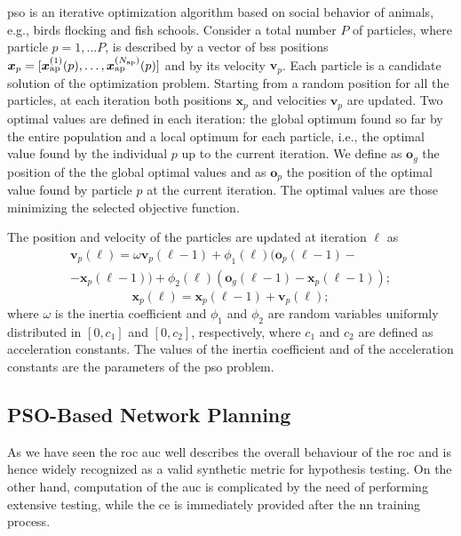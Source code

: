 \documentclass[conference,draftcls,onecolumn]{IEEEtran}
\begin{document}
\ac{pso} is an iterative optimization algorithm based on social behavior of animals, e.g., birds flocking and fish schools. Consider a total number $P$ of particles, where  particle $p=1, \ldots P$, is described by a vector of \acp{bs} positions $\bm{x}_p = [\bm{x}_{\rm ap}^{(1)}(p),\ldots, \bm{x}_{\rm ap}^{(N_{\rm ap})}(p)]$ and by its velocity $\bm{v}_p$.  Each particle is a candidate solution of the optimization problem. Starting from a random position for all the particles, at each iteration both  positions $\bm{x}_p$ and  velocities $\bm{v}_p$ are updated. Two optimal values are defined in each iteration: the global optimum found so far by the entire population and a local optimum for each particle, i.e., the optimal value found by the individual $p$ up to the current iteration. We define as $\bm{o}_g$ the position of the the global optimal values and as $\bm{o}_p$ the position of the optimal value found by particle $p$ at the current iteration. The optimal values are those minimizing the selected objective function.

The position and velocity of the particles are updated at iteration $\ell$ as \cite{Kennedy-11}
   \begin{equation}\label{eq: v up}
\begin{split}
  \bm{v}_p(\ell) = \omega \bm{v}_p(\ell-1)+\phi_1(\ell)(\bm{o}_p(\ell-1)-\\
  -\bm{x}_p(\ell-1))+\phi_2(\ell)(\bm{o}_g(\ell-1)-\bm{x}_p(\ell-1));
  \end{split}
  \end{equation}
  \begin{equation}\label{eq: p up}
  \bm{x}_p(\ell) = \bm{x}_p(\ell-1) + \bm{v}_p(\ell);
 \end{equation}
where $\omega$ is the inertia coefficient and $\phi_1$ and $\phi_2$ are random variables uniformly distributed in $[0,c_1]$ and $[0,c_2]$, respectively, where $c_1$ and $c_2$ are defined as acceleration constants. The values of the inertia coefficient and of the acceleration constants are the parameters of the \ac{pso} problem.

\subsection{PSO-Based Network Planning}

As we have seen the \ac{roc} \ac{auc} well describes the overall behaviour of the \ac{roc} and is hence widely recognized as a valid synthetic metric for hypothesis testing. On the other hand, computation of the \ac{auc} is complicated by the need of performing extensive testing, while the \ac{ce} is immediately provided after the \ac{nn} training process. 
\end{document}

